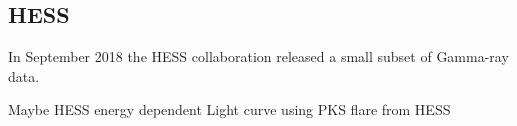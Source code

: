 \subsection{HESS}
\label{ssec:hess}

In September 2018 the HESS collaboration released a small subset of Gamma-ray
data.

Maybe HESS energy dependent Light curve using PKS flare from HESS
